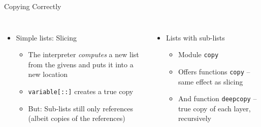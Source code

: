 
\begin{frame}[fragile]{Copying Correctly}
%
\begin{columns}[T]
\begin{itemize}
\item Simple lists: Slicing
	\begin{itemize}
	\item The interpreter \emph{computes} a new list from the givens and puts it into a new location
	\item[\Thus] \texttt{variable[::]} creates a true copy
	\item But: Sub-lists still only references (albeit copies of the references)
	\end{itemize}
\end{itemize}
%
\begin{itemize}
\item Lists with sub-lists
	\begin{itemize}
	\item Module \texttt{copy}
	\item Offers functions \texttt{copy} -- same effect as slicing
	\item And function \texttt{deepcopy} -- true copy of each layer, recursively
	\end{itemize}
\end{itemize}
\end{columns}
%
\end{frame}


